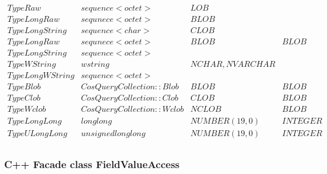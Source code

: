 \documentclass[10pt]{article}
\begin{document}
\begin{footnotesize}
$$\begin{array}{|c|c|c|c|}
     TypeRaw  &  sequence<octet>  &  LOB &\\
     TypeLongRaw & sequnece<octet> & BLOB &\\
     TypeLongString & sequence<char> &  CLOB &\\
     TypeLongRaw & sequnece<octet> & BLOB                    & BLOB \\
     TypeLongString & sequence<octet> && \\
     TypeWString & wstring  & NCHAR, NVARCHAR &\\
     TypeLongWString & sequence<octet> && \\
     TypeBlob & CosQueryCollection::Blob & BLOB & BLOB \\
     TypeClob & CosQueryCollection::Clob & CLOB & BLOB \\
     TypeWclob & CosQueryCollection::Wclob & NCLOB & BLOB \\ \hline
     TypeLongLong & long long    & NUMBER(19,0)   & INTEGER  \\
     TypeULongLong & unsigned long long    & NUMBER(19,0)   & INTEGER  \\
   \end{array}
  $$
\end{footnotesize}
   
\subsubsection{ C++ Facade class  FieldValueAccess }
\end{document}
